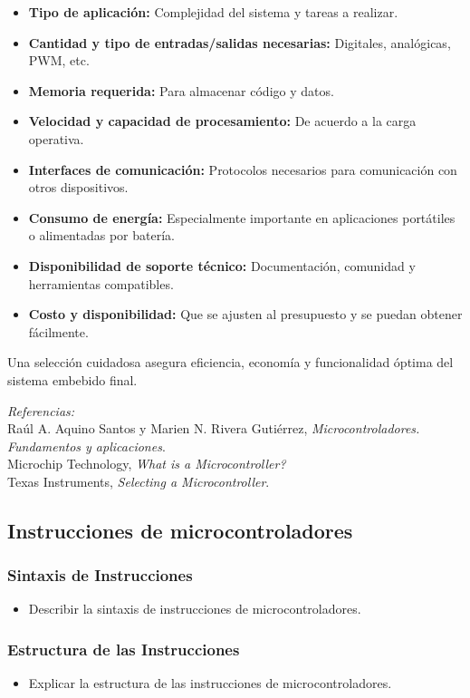 \documentclass[a4paper,12pt]{article}
\begin{document}
	\begin{itemize}
		\item \textbf{Tipo de aplicación:} Complejidad del sistema y tareas a realizar.
		\item \textbf{Cantidad y tipo de entradas/salidas necesarias:} Digitales, analógicas, PWM, etc.
		\item \textbf{Memoria requerida:} Para almacenar código y datos.
		\item \textbf{Velocidad y capacidad de procesamiento:} De acuerdo a la carga operativa.
		\item \textbf{Interfaces de comunicación:} Protocolos necesarios para comunicación con otros dispositivos.
		\item \textbf{Consumo de energía:} Especialmente importante en aplicaciones portátiles o alimentadas por batería.
		\item \textbf{Disponibilidad de soporte técnico:} Documentación, comunidad y herramientas compatibles.
		\item \textbf{Costo y disponibilidad:} Que se ajusten al presupuesto y se puedan obtener fácilmente.
	\end{itemize}
	
	Una selección cuidadosa asegura eficiencia, economía y funcionalidad óptima del sistema embebido final.
	
	\vspace{0.5cm}
	\noindent \textit{Referencias:} \\
	Raúl A. Aquino Santos y Marien N. Rivera Gutiérrez, \textit{Microcontroladores. Fundamentos y aplicaciones}. \\
	Microchip Technology, \textit{What is a Microcontroller?} \\
	Texas Instruments, \textit{Selecting a Microcontroller}. 
	

	
	\subsection{Instrucciones de microcontroladores}
	\subsubsection{Sintaxis de Instrucciones}
	\begin{itemize}
		\item Describir la sintaxis de instrucciones de microcontroladores.
	\end{itemize}
	\subsubsection{Estructura de las Instrucciones}
	\begin{itemize}
		\item Explicar la estructura de las instrucciones de microcontroladores.
	\end{itemize}
\end{document}
